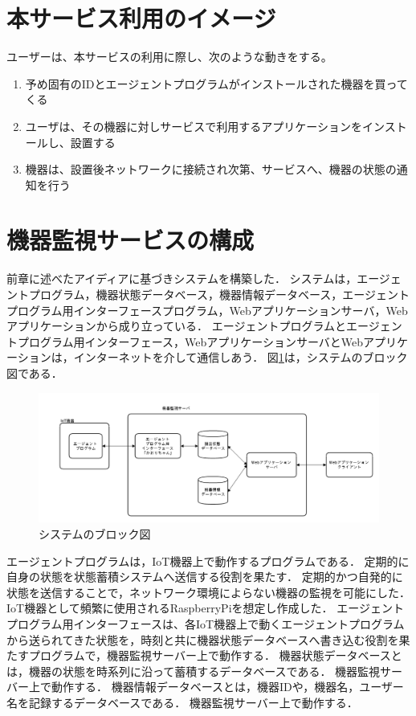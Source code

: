 \section{本サービス利用のイメージ}
ユーザーは、本サービスの利用に際し、次のような動きをする。
\begin{enumerate}
\item 予め固有のIDとエージェントプログラムがインストールされた機器を買ってくる
\item ユーザは、その機器に対しサービスで利用するアプリケーションをインストールし、設置する
\item 機器は、設置後ネットワークに接続され次第、サービスへ、機器の状態の通知を行う
\end{enumerate}



\section{機器監視サービスの構成}
前章に述べたアイディアに基づきシステムを構築した．
システムは，エージェントプログラム，機器状態データベース，機器情報データベース，エージェントプログラム用インターフェースプログラム，Webアプリケーションサーバ，Webアプリケーションから成り立っている．
エージェントプログラムとエージェントプログラム用インターフェース，WebアプリケーションサーバとWebアプリケーションは，インターネットを介して通信しあう．
図\ref{fig:blockdiagram}は，システムのブロック図である．
\medskip

\begin{figure}[htbp]
\includegraphics[width=16cm]{images/blockdiagram2.png}
\caption{システムのブロック図}
\label{fig:blockdiagram}
\end{figure}

エージェントプログラムは，IoT機器上で動作するプログラムである．
定期的に自身の状態を状態蓄積システムへ送信する役割を果たす．
定期的かつ自発的に状態を送信することで，ネットワーク環境によらない機器の監視を可能にした．
IoT機器として頻繁に使用されるRaspberryPiを想定し作成した．
エージェントプログラム用インターフェースは、各IoT機器上で動くエージェントプログラムから送られてきた状態を，時刻と共に機器状態データベースへ書き込む役割を果たすプログラムで，機器監視サーバー上で動作する．
機器状態データベースとは，機器の状態を時系列に沿って蓄積するデータベースである．
機器監視サーバー上で動作する．
機器情報データベースとは，機器IDや，機器名，ユーザー名を記録するデータベースである．
機器監視サーバー上で動作する．
\medskip

